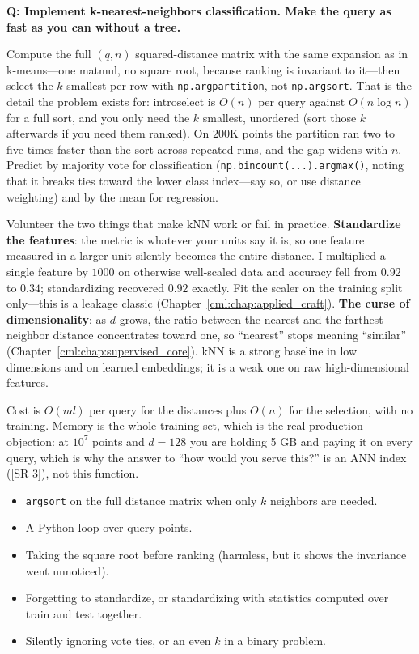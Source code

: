 \begin{interviewq}
\textbf{Q: Implement k-nearest-neighbors classification. Make the query as fast as you can without a tree.}

 \quad {} \quad \badgefreq{\freqhigh}

\stronganswer

Compute the full $(q, n)$ squared-distance matrix with the same expansion as in k-means---one matmul, no square root, because ranking is invariant to it---then select the $k$ smallest per row with \texttt{np.argpartition}, not \texttt{np.argsort}. That is the detail the problem exists for: introselect is $O(n)$ per query against $O(n \log n)$ for a full sort, and you only need the $k$ smallest, unordered (sort those $k$ afterwards if you need them ranked). On $200$K points the partition ran two to five times faster than the sort across repeated runs, and the gap widens with $n$. Predict by majority vote for classification (\texttt{np.bincount(...).argmax()}, noting that it breaks ties toward the lower class index---say so, or use distance weighting) and by the mean for regression.

Volunteer the two things that make kNN work or fail in practice. \textbf{Standardize the features}: the metric is whatever your units say it is, so one feature measured in a larger unit silently becomes the entire distance. I multiplied a single feature by $1000$ on otherwise well-scaled data and accuracy fell from $0.92$ to $0.34$; standardizing recovered $0.92$ exactly. Fit the scaler on the training split only---this is a leakage classic (Chapter~\ref{cml:chap:applied_craft}). \textbf{The curse of dimensionality}: as $d$ grows, the ratio between the nearest and the farthest neighbor distance concentrates toward one, so ``nearest'' stops meaning ``similar'' (Chapter~\ref{cml:chap:supervised_core}). kNN is a strong baseline in low dimensions and on learned embeddings; it is a weak one on raw high-dimensional features.

Cost is $O(nd)$ per query for the distances plus $O(n)$ for the selection, with no training. Memory is the whole training set, which is the real production objection: at $10^7$ points and $d = 128$ you are holding 5 GB and paying it on every query, which is why the answer to ``how would you serve this?'' is an ANN index ([SR 3]), not this function.

\redflags
\begin{itemize}
    \item \texttt{argsort} on the full distance matrix when only $k$ neighbors are needed.
    \item A Python loop over query points.
    \item Taking the square root before ranking (harmless, but it shows the invariance went unnoticed).
    \item Forgetting to standardize, or standardizing with statistics computed over train and test together.
    \item Silently ignoring vote ties, or an even $k$ in a binary problem.
\end{itemize}


\end{interviewq}
